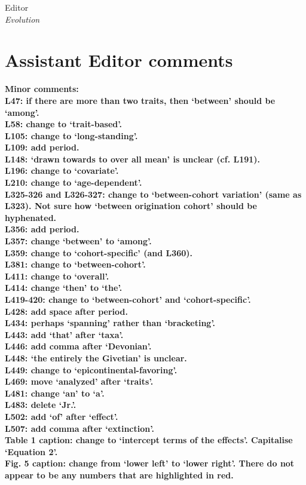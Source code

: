 \documentclass{letter}
\begin{document}
\begin{letter}{Editor \\ \textit{Evolution}}
  \section{Assistant Editor comments}
  \textbf{Minor comments: \\
  L47: if there are more than two traits, then ‘between’ should be ‘among’. \\
  L58: change to ‘trait-based’. \\
  L105: change to ‘long-standing’. \\
  L109: add period. \\
  L148: ‘drawn towards to over all mean’ is unclear (cf. L191). \\
  L196: change to ‘covariate’. \\
  L210: change to ‘age-dependent’. \\
  L325-326 and L326-327: change to ‘between-cohort variation’ (same as L323). Not sure how ‘between origination cohort’ should be hyphenated. \\
  L356: add period. \\
  L357: change ‘between’ to ‘among’. \\
  L359: change to ‘cohort-specific’ (and L360). \\
  L381: change to ‘between-cohort’. \\
  L411: change to ‘overall’. \\
  L414: change ‘then’ to ‘the’. \\
  L419-420: change to ‘between-cohort’ and ‘cohort-specific’. \\
  L428: add space after period. \\
  L434: perhaps ‘spanning’ rather than ‘bracketing’. \\
  L443: add ‘that’ after ‘taxa’. \\
  L446: add comma after ‘Devonian’. \\
  L448: ‘the entirely the Givetian’ is unclear. \\
  L449: change to ‘epicontinental-favoring’. \\
  L469: move ‘analyzed’ after ‘traits’. \\
  L481: change ‘an’ to ‘a’. \\
  L483: delete ‘Jr.’. \\
  L502: add ‘of’ after ‘effect’. \\
  L507: add comma after ‘extinction’. \\
  Table 1 caption: change to ‘intercept terms of the effects’. Capitalise ‘Equation 2’. \\
Fig. 5 caption: change from ‘lower left’ to ‘lower right’. There do not appear to be any numbers that are highlighted in red.}


\end{letter}
\end{document}
